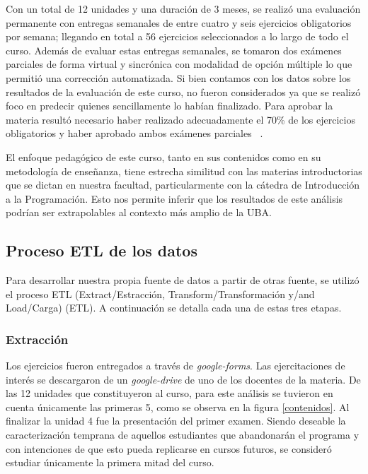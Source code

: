 \documentclass[11pt,a4paper,twoside,openany]{tesis}
\begin{document}
Con un total de 12 unidades y una duración de 3 meses, se realizó una evaluación permanente con entregas semanales de entre cuatro y seis ejercicios obligatorios por semana; llegando en total a  56  ejercicios  seleccionados  a  lo  largo  de  todo  el  curso.  Además  de  evaluar  estas  entregas semanales, se tomaron dos exámenes parciales de forma virtual y sincrónica con modalidad de opción múltiple lo que permitió una corrección automatizada. Si bien contamos con los datos sobre los resultados de la evaluación de este curso, no fueron considerados ya que se realizó foco en predecir quienes sencillamente lo habían finalizado. Para aprobar la materia resultó necesario haber realizado adecuadamente el 70\% de los  ejercicios  obligatorios  y  haber  aprobado  ambos  exámenes  parciales ~\cite{unsam2020}.

El enfoque pedagógico de este curso, tanto en sus contenidos como en su metodología de enseñanza, tiene estrecha similitud con las materias introductorias que se dictan en nuestra facultad, particularmente con la cátedra de Introducción a la Programación. Esto nos permite inferir que los resultados de este análisis podrían ser extrapolables al contexto más amplio de la UBA.


\subsection{Proceso ETL de los datos}

Para desarrollar nuestra propia fuente de datos a partir de otras fuente, se utilizó el proceso ETL (Extract/Estracción, Transform/Transformación y/and Load/Carga) (ETL). A continuación se detalla cada una de estas tres etapas.

\subsubsection{Extracción}\textbf{ }

Los ejercicios fueron entregados a través de \emph{google-forms}. Las ejercitaciones de interés se descargaron de un \emph{google-drive} de uno de los docentes de la materia. De las 12 unidades que constituyeron al curso, para este análisis se tuvieron en cuenta únicamente las primeras 5, como se observa en la figura \ref{contenidos}. Al finalizar la unidad 4 fue la presentación del primer examen. Siendo deseable la caracterización temprana de aquellos estudiantes que abandonarán el programa y con intenciones de que esto pueda replicarse en cursos futuros, se consideró estudiar únicamente la primera mitad del curso. 
\end{document}
